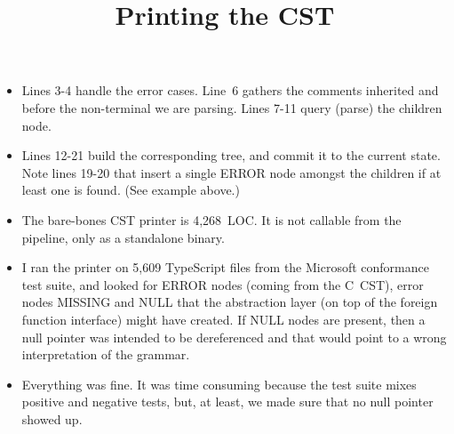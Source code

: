 \documentclass[wide]{slides}
\newcommand{\TypeScript}[0]{\textsf{TypeScript}}
\begin{document}
\begin{slide}
  \title{Printing the CST}

  \begin{itemize}

    \item Lines 3-4 handle the error cases. Line~6 gathers the
      comments inherited and before the non\hyp{}terminal we are
      parsing. Lines 7-11 query (parse) the children node.

    \item Lines 12-21 build the corresponding tree, and commit it to
      the current state. Note lines 19-20 that insert a single ERROR
      node amongst the children if at least one is found. (See example
      above.)

    \item The bare\hyp{}bones CST printer is 4,268~LOC. It is not
      callable from the pipeline, only as a standalone binary.

    \item I ran the printer on 5,609 \TypeScript{} files from the
      Microsoft conformance test suite, and looked for ERROR nodes
      (coming from the C~CST), error nodes MISSING and NULL that the
      abstraction layer (on top of the foreign function interface)
      might have created. If NULL nodes are present, then a null
      pointer was intended to be dereferenced and that would point to
      a wrong interpretation of the grammar.

    \item Everything was fine. It was time consuming because the test
      suite mixes positive and negative tests, but, at least, we made
      sure that no null pointer showed up.

  \end{itemize}

\end{slide}
\end{document}
